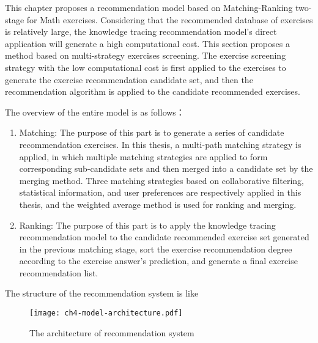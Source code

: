This chapter proposes a recommendation model based on Matching-Ranking two-stage for Math exercises. Considering that the recommended database of exercises is relatively large, the knowledge tracing recommendation model's direct application will generate a high computational cost. This section proposes a method based on multi-strategy exercises screening. The exercise screening strategy with the low computational cost is first applied to the exercises to generate the exercise recommendation candidate set, and then the recommendation algorithm is applied to the candidate recommended exercises.



The overview of the entire model is as follows：
\begin{enumerate}
    \item Matching: The purpose of this part is to generate a series of candidate recommendation exercises. In this thesis, a multi-path matching strategy is applied, in which multiple matching strategies are applied to form corresponding sub-candidate sets and then merged into a candidate set by the merging method. Three matching strategies based on collaborative filtering, statistical information, and user preferences are respectively applied in this thesis, and the weighted average method is used for ranking and merging.
    \item Ranking: The purpose of this part is to apply the knowledge tracing recommendation model to the candidate recommended exercise set generated in the previous matching stage, sort the exercise recommendation degree according to the exercise answer's prediction, and generate a final exercise recommendation list.
\end{enumerate}

The structure of the recommendation system is like \figname{\ref{fig:ch4-model-architecture}}

\begin{figure}[htbp!]
    \centering
    \texttt{[image: ch4-model-architecture.pdf]}
    \caption{The architecture of recommendation system}\label{fig:ch4-model-architecture}
\end{figure}

